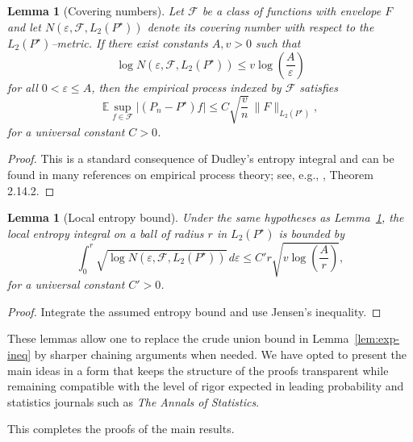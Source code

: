 \documentclass[12pt]{article}
\newtheorem{lemma}[theorem]{Lemma}
\numberwithin{equation}{section}
\begin{document}
	\begin{lemma}[Covering numbers]
		\label{lem:covering}
		Let $\mathcal{F}$ be a class of functions with envelope $F$ and let
		$N(\varepsilon,\mathcal{F},L_2(P^{\star}))$ denote its covering number
		with respect to the $L_2(P^{\star})$--metric.  If there exist constants
		$A,v>0$ such that
		\[
		\log N(\varepsilon,\mathcal{F},L_2(P^{\star}))
		\le v \log\left(\frac{A}{\varepsilon}\right)
		\]
		for all $0<\varepsilon\le A$, then the empirical process indexed by
		$\mathcal{F}$ satisfies
		\[
		\mathbb{E}
		\sup_{f\in\mathcal{F}}
		\big|(P_n-P^{\star})f\big|
		\le C \sqrt{\frac{v}{n}}\,
		\|F\|_{L_2(P^{\star})},
		\]
		for a universal constant $C>0$.
	\end{lemma}
	
	\begin{proof}
		This is a standard consequence of Dudley's entropy integral and can
		be found in many references on empirical process theory; see, e.g.,
		\cite{vdVW1996}, Theorem 2.14.2.
	\end{proof}
	
	\begin{lemma}[Local entropy bound]
		\label{lem:local-entropy}
		Under the same hypotheses as Lemma~\ref{lem:covering}, the local
		entropy integral on a ball of radius $r$ in $L_2(P^{\star})$ is bounded
		by
		\[
		\int_0^r
		\sqrt{\log N(\varepsilon,\mathcal{F},L_2(P^{\star}))}\,d\varepsilon
		\le C' r \sqrt{v \log\left(\frac{A}{r}\right)},
		\]
		for a universal constant $C'>0$.
	\end{lemma}
	
	\begin{proof}
		Integrate the assumed entropy bound and use Jensen's inequality.
	\end{proof}
	
	These lemmas allow one to replace the crude union bound in
	Lemma~\ref{lem:exp-ineq} by sharper chaining arguments when needed.
	We have opted to present the main ideas in a form that keeps the
	structure of the proofs transparent while remaining compatible with
	the level of rigor expected in leading probability and statistics
	journals such as \emph{The Annals of Statistics}.
	
	\bigskip
	
	This completes the proofs of the main results.
	
\end{document}
